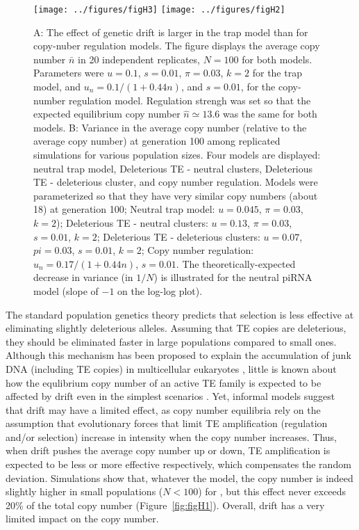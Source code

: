 \documentclass[10pt,a4paper]{article}
\begin{document}
\begin{figure}
\begin{adjustwidth}{0in}{0in}
\begin{center}
	\texttt{[image: ../figures/figH3]}
	\texttt{[image: ../figures/figH2]}
\caption{\label{fig:figH2} A: The effect of genetic drift is larger in the trap model than for copy-nuber regulation models. The figure displays the average copy number $\bar n$ in 20 independent replicates, $N=100$ for both models. Parameters were $u=0.1$, $s=0.01$, $\pi=0.03$, $k=2$ for the trap model, and $u_n=0.1/(1+0.44n)$, and $s=0.01$, for the copy-number regulation model. Regulation strengh was set so that the expected equilibrium copy number $\hat n \simeq 13.6$ was the same for both models. B: Variance in the average copy number (relative to the average copy number) at generation 100 among replicated simulations for various population sizes. Four models are displayed: neutral trap model, Deleterious TE - neutral clusters, Deleterious TE - deleterious cluster, and copy number regulation. Models were parameterized so that they have very similar copy numbers (about 18) at generation 100; Neutral trap model: $u=0.045$, $\pi=0.03$, $k=2$); Deleterious TE - neutral clusters: $u=0.13$, $\pi=0.03$, $s=0.01$, $k=2$; Deleterious TE - deleterious clusters: $u=0.07$, $pi=0.03$, $s=0.01$, $k=2$; Copy number regulation: $u_n = 0.17/(1+0.44n)$, $s=0.01$. The theoretically-expected decrease in variance (in $1/N$) is illustrated for the neutral piRNA model (slope of $-1$ on the log-log plot). }
\end{center}\end{adjustwidth}
\end{figure}

The standard population genetics theory predicts that selection is less effective at eliminating slightly deleterious alleles. Assuming that TE copies are deleterious, they should be eliminated faster in large populations compared to small ones. Although this mechanism has been proposed to explain the accumulation of junk DNA (including TE copies) in multicellular eukaryotes \citep{LC03}, little is known about how the equlibrium copy number of an active TE family is expected to be affected by drift even in the simplest scenarios \citep{CC83}. Yet, informal models suggest that drift may have a limited effect, as copy number equilibria rely on the assumption that evolutionary forces that limit TE amplification (regulation and/or selection) increase in intensity when the copy number increases. Thus, when drift pushes the average copy number up or down, TE amplification is expected to be less or more effective respectively, which compensates the random deviation. Simulations show that, whatever the model, the copy number is indeed slightly higher in small populations ($N < 100$) for , but this effect never exceeds 20\% of the total copy number (Figure~\ref{fig:figH1}). Overall, drift has a very limited impact on the copy number. 
\end{document}

